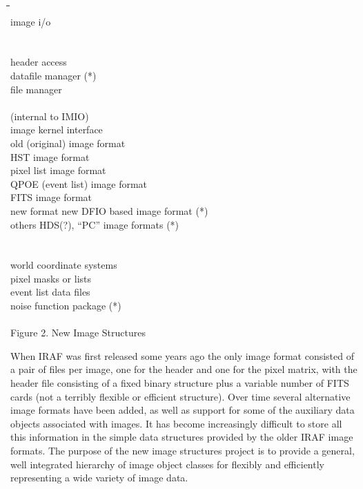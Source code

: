 \small
\begin{tabbing}
\hspace{0.3in}\=\hspace{0.3in}\=\hspace{0.3in}\=\hspace{2in}\=\kill
{}\\
    \>                \>\>image i/o\\
\\
\\
    \>                \>\>header access\\
	\>\>          \>datafile manager (*)\\
	\>\>          \>file manager\\
\\
 (internal to IMIO)\\
    \>                 \>\>image kernel interface\\
	\>\>           \>old (original) image format\\
	\>\>           \>HST image format\\
	\>\>           \>pixel list image format\\
	\>\>           \>QPOE (event list) image format\\
	\>\>           \>FITS image format\\
	\>\>\>new format          \>new DFIO based image format (*)\\
	\>\>\>others              \>HDS(?), ``PC'' image formats (*)\\
\\
\\
    \>                \>\>world coordinate systems\\
    \>     \>\>pixel masks or lists\\
    \>                \>\>event list data files\\
    \>                \>\>noise function package (*)\\
\\
\> \normalsize {Figure 2.} New Image Structures\\
\end{tabbing}
\normalsize
\vskip -12pt

When IRAF was first released some years ago the only image format consisted
of a pair of files per image, one for the header and one for the pixel
matrix, with the header file consisting of a fixed binary structure plus a
variable number of FITS cards (not a terribly flexible or efficient
structure).  Over time several alternative image formats have been added, as
well as support for some of the auxiliary data objects associated with
images.  It has become increasingly difficult to store all this information
in the simple data structures provided by the older IRAF image formats.  The
purpose of the new image structures project is to provide a general, well
integrated hierarchy of image object classes for flexibly and efficiently
representing a wide variety of image data.

